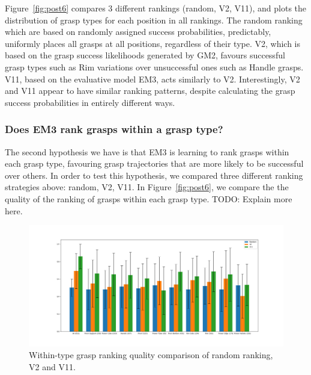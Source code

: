 Figure~\ref{fig:post6} compares 3 different rankings (random, V2, V11), and plots the distribution of grasp types for each position in all rankings. The random ranking which are based on randomly assigned success probabilities, predictably, uniformly places all grasps at all positions, regardless of their type. V2, which is based on the grasp success likelihoods generated by GM2, favours successful grasp types such as Rim variations over unsuccessful ones such as Handle grasps. V11, based on the evaluative model EM3, acts similarly to V2. Interestingly, V2 and V11 appear to have similar ranking patterns, despite calculating the grasp success probabilities in entirely different ways. 



\subsubsection{Does EM3 rank grasps within a grasp type?}
\noindent

The second hypothesis we have is that EM3 is learning to rank grasps within each grasp type, favouring grasp trajectories that are more likely to be successful over others. In order to test this hypothesis, we compared three different ranking strategies above: random, V2, V11. In Figure~\ref{fig:post6}, we compare the the quality of the ranking of grasps within each grasp type. TODO: Explain more here.


\begin{figure}
\centering
\includegraphics[width=0.999\columnwidth]{images/post-analysis/Ranking_quality_mean_AUC.png}
\caption{Within-type grasp ranking quality comparison of random ranking, V2 and V11.}
\label{fig:post5}
\end{figure}

